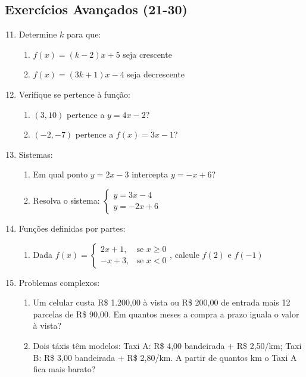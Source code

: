 \documentclass[11pt]{article}
\begin{document}
\begin{multicols}{2}
\section*{Exercícios Avançados (21-30)}
\begin{enumerate}\setcounter{enumi}{10}
    \item Determine \( k \) para que:
    \begin{enumerate}[label=\alph*)]
        \item \( f(x) = (k-2)x + 5 \) seja crescente
        \item \( f(x) = (3k+1)x - 4 \) seja decrescente
    \end{enumerate}
    
    \item Verifique se pertence à função:
    \begin{enumerate}[label=\alph*)]
        \item \( (3,10) \) pertence a \( y = 4x - 2 \)?
        \item \( (-2,-7) \) pertence a \( f(x) = 3x - 1 \)?
    \end{enumerate}
    
    \item Sistemas:
    \begin{enumerate}[label=\alph*)]
        \item Em qual ponto \( y = 2x - 3 \) intercepta \( y = -x + 6 \)?
        \item Resolva o sistema: \( \begin{cases} y = 3x - 4 \\ y = -2x + 6 \end{cases} \)
    \end{enumerate}
    
    \item Funções definidas por partes:
    \begin{enumerate}[label=\alph*)]
        \item Dada \( f(x) = \begin{cases} 2x+1, & \text{se } x \geq 0 \\ -x+3, & \text{se } x < 0 \end{cases} \), calcule \( f(2) \) e \( f(-1) \)
    \end{enumerate}
    
    \item Problemas complexos:
    \begin{enumerate}[label=\alph*)]
        \item Um celular custa R\$ 1.200,00 à vista ou R\$ 200,00 de entrada mais 12 parcelas de R\$ 90,00. Em quantos meses a compra a prazo iguala o valor à vista?
        \item Dois táxis têm modelos: Taxi A: R\$ 4,00 bandeirada + R\$ 2,50/km; Taxi B: R\$ 3,00 bandeirada + R\$ 2,80/km. A partir de quantos km o Taxi A fica mais barato?
    \end{enumerate}
\end{enumerate}


\end{multicols}
\end{document}
